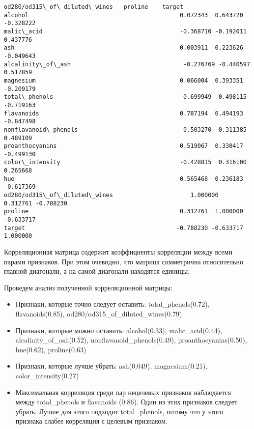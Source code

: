 \documentclass[11pt]{article}
\providecommand{\tightlist}{%
      \setlength{\itemsep}{0pt}\setlength{\parskip}{0pt}}
\begin{document}
\begin{tcolorbox}[breakable, size=fbox, boxrule=.5pt, pad at break*=1mm, opacityfill=0]
\begin{Verbatim}[commandchars=\\\{\}]
                              od280/od315\_of\_diluted\_wines   proline    target
alcohol                                           0.072343  0.643720 -0.328222
malic\_acid                                       -0.368710 -0.192011  0.437776
ash                                               0.003911  0.223626 -0.049643
alcalinity\_of\_ash                                -0.276769 -0.440597  0.517859
magnesium                                         0.066004  0.393351 -0.209179
total\_phenols                                     0.699949  0.498115 -0.719163
flavanoids                                        0.787194  0.494193 -0.847498
nonflavanoid\_phenols                             -0.503270 -0.311385  0.489109
proanthocyanins                                   0.519067  0.330417 -0.499130
color\_intensity                                  -0.428815  0.316100  0.265668
hue                                               0.565468  0.236183 -0.617369
od280/od315\_of\_diluted\_wines                      1.000000  0.312761 -0.788230
proline                                           0.312761  1.000000 -0.633717
target                                           -0.788230 -0.633717  1.000000
\end{Verbatim}
\end{tcolorbox}
        
    Корреляционная матрица содержит коэффициенты корреляции между всеми
парами признаков. При этом очевидно, что матрица симметрична
относительно главной диагонали, а на самой диагонали находятся единицы.

    Проведем анализ полученной корреляционной матрицы:

    \begin{itemize}
\tightlist
\item
  Признаки, которые точно следует оставить: total\_phenols(0.72),
  flavanoids(0.85), od280/od315\_of\_diluted\_wines(0.79)
\item
  Признаки, которые можно оставить: alcohol(0.33), malic\_acid(0.44),
  alcalinity\_of\_ash(0.52), nonflavanoid\_phenols(0.49),
  proanthocyanins(0.50), hue(0.62), proline(0.63)
\item
  Признаки, которые лучше убрать: ash(0.049), magnesium(0.21),
  color\_intensity(0.27)
\end{itemize}

    \begin{itemize}
\tightlist
\item
  Максимальная корреляция среди пар нецелевых признаков наблюдается
  между total\_phenols и flavanoids (0.86). Один из этих признаков
  следует убрать. Лучше для этого подходит total\_phenols, потому что у
  этого признака слабее корреляция с целевым признаком.
\end{itemize}
\end{document}

